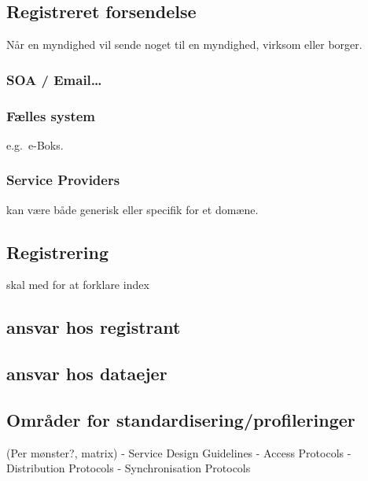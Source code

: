 \subsection{Registreret forsendelse}\label{registreret-forsendelse}

Når en myndighed vil sende noget til en myndighed, virksom eller borger.

\subsubsection{SOA / Email\ldots{}}\label{soa-email}

\subsubsection{Fælles system}\label{fuxe6lles-system}

e.g.~e-Boks.

\subsubsection{Service Providers}\label{service-providers}

kan være både generisk eller specifik for et domæne.

\subsection{Registrering}\label{registrering}

skal med for at forklare index

\subsection{ansvar hos registrant}\label{ansvar-hos-registrant}

\subsection{ansvar hos dataejer}\label{ansvar-hos-dataejer}

\subsection{Områder for
standardisering/profileringer}\label{omruxe5der-for-standardiseringprofileringer}

(Per mønster?, matrix) - Service Design Guidelines - Access Protocols -
Distribution Protocols - Synchronisation Protocols

